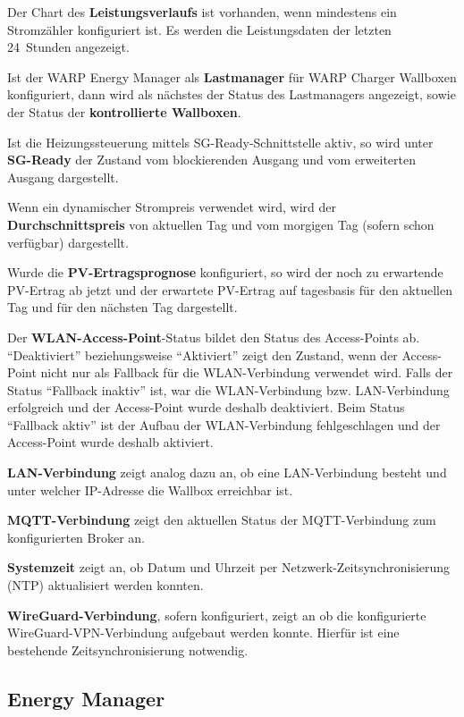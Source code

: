 \documentclass[a4paper,10pt]{article}
\begin{document}
\begin{multicols*}{2}
	Der Chart des \textbf{Leistungsverlaufs} ist vorhanden, wenn mindestens ein Stromzähler konfiguriert ist.
	Es werden die Leistungsdaten der letzten 24~Stunden angezeigt.
    
    Ist der WARP Energy Manager als \textbf{Lastmanager} für WARP Charger Wallboxen konfiguriert, dann wird als nächstes der Status des Lastmanagers angezeigt, sowie 
	der Status der \textbf{kontrollierte Wallboxen}.
    
    Ist die Heizungssteuerung mittels SG-Ready-Schnittstelle aktiv, so wird unter \textbf{SG-Ready} der Zustand vom blockierenden Ausgang und vom erweiterten Ausgang dargestellt.
    
    Wenn ein dynamischer Strompreis verwendet wird, wird der \textbf{Durchschnittspreis} von aktuellen Tag und vom morgigen Tag (sofern schon verfügbar) dargestellt.
    
    Wurde die \textbf{PV-Ertragsprognose} konfiguriert, so wird der noch zu erwartende PV-Ertrag ab jetzt und der erwartete PV-Ertrag auf tagesbasis für den aktuellen Tag und für den nächsten Tag dargestellt.

	Der \textbf{WLAN-Access-Point}-Status bildet den Status des Access-Points ab. \enquote{Deaktiviert} beziehungsweise \enquote{Aktiviert} zeigt den Zustand, wenn der Access-Point nicht
	nur als Fallback für die WLAN-Verbindung verwendet wird. Falls der Status \enquote{Fallback inaktiv} ist,
	war die WLAN-Verbindung bzw. LAN-Verbindung erfolgreich und der Access-Point wurde deshalb deaktiviert.
	Beim Status \enquote{Fallback aktiv} ist der Aufbau der WLAN-Verbindung fehlgeschlagen und der
	Access-Point wurde deshalb aktiviert.

	\textbf{LAN-Verbindung} zeigt analog dazu an, ob eine LAN-Verbindung besteht und unter welcher IP-Adresse die Wallbox erreichbar ist.
    
    \textbf{MQTT-Verbindung} zeigt den aktuellen Status der MQTT-Verbindung zum konfigurierten Broker an.
	
	\textbf{Systemzeit} zeigt an, ob Datum und Uhrzeit per Netzwerk-Zeitsynchronisierung (NTP) aktualisiert werden konnten.

	\textbf{WireGuard-Verbindung}, sofern konfiguriert, zeigt an ob die konfigurierte WireGuard-VPN-Verbindung aufgebaut werden konnte. Hierfür ist eine bestehende Zeitsynchronisierung notwendig.

	
    \subsection{Energy Manager}

\end{multicols*}
\end{document}

